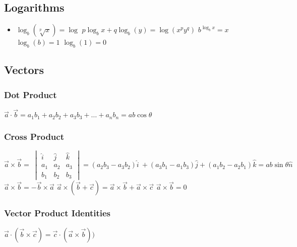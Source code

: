 \subsection{Logarithms}

\begin{itemize}
\itemt \( y = \log_b (x);\ x = b^y \)
\itemt \( \log_b(xy) = \log_bx + \log_b(y) \)
\itemt \( \log_b(\dfrac{x}{y}) = \log_bx - \log_b(y) \)
\itemt \( \log_b(x^p) = p\log_bx \)
\itemt \( \log_b(b^x) = x \)
\itemt \( \log_b(a) = \dfrac{\log_d(a)}{\log_d(b)} \)
\item[]
\itemt \( \log_b(\sqrt[p]{x}) = \log \)
\itemt \( p\log_bx + q\log_b(y) = \log(x^p y^q) \)
\itemt \( b^{\log_bx} = x \)
\itemt \( \log_b(b) = 1 \)
\itemt \( \log_b(1) = 0 \)
\end{itemize}

\subsection{Vectors}

\subsubsection{Dot Product}
\begin{itemize}
\itemt \( \vec{a} \cdot \vec{b} = a_1b_1 + a_2b_2 + a_3b_3 + \ldots +a_nb_n = ab\cos\theta \)
\end{itemize}

\def\arraystretch{1}
\subsubsection{Cross Product}
\begin{itemize}
\itemt \( \vec{a} \times \vec{b} =\ 
\begin{vmatrix}
\hat{i} & \hat{j} 	& \hat{k} 	\\
a_1		& a_2		& a_3		\\
b_1		& b_2		& b_3		
\end{vmatrix}  = (a_2b_3 - a_3b_2)\hat{i}\ + (a_3b_1 - a_1b_3)\hat{j} + (a_1b_2 - a_2b_1)\hat{k} = ab\sin\theta\hat{n} \)
\itemt \( \vec{a} \times \vec{b} = - \vec{b} \times \vec{a} \)
\itemt \( \vec{a} \times (\vec{b} + \vec{c}) = \vec{a} \times \vec{b} + \vec{a} \times \vec{c} \)
\itemt \( \vec{a} \times \vec{b} = 0 \)
\end{itemize}

\subsubsection{Vector Product Identities}
\begin{itemize}
    \itemt \( \vec{a}\cdot(\vec{b}\times\vec{c}) = \vec{c}\cdot(\vec{a}\times\vec{b})) \)
\end{itemize}

